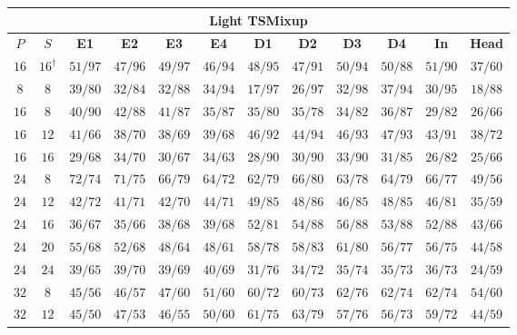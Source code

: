 \begin{table}[!tbp]
    \centering
    \small
    \setlength{\tabcolsep}{3.5pt}
    \begin{tabular}{@{}cccccccccccc@{}}
        \toprule
        \multicolumn{12}{c}{\textbf{Light TSMixup}} \\
        \midrule
        \textbf{$P$} & \textbf{$S$} & \textbf{E1} & \textbf{E2} & \textbf{E3} & \textbf{E4} & \textbf{D1} & \textbf{D2} & \textbf{D3} & \textbf{D4} & \textbf{In} & \textbf{Head} \\
        \midrule
        $16$ & $16^{\dagger}$ & $51/97$ & $47/96$ & $49/97$ & $46/94$ & $48/95$ & $47/91$ & $50/94$ & $50/88$ & $51/90$ & $37/60$ \\
        \midrule
        \addlinespace[2pt]
        $8$ & $8$ & $39/80$ & $32/84$ & $32/88$ & $34/94$ & $17/97$ & $26/97$ & $32/98$ & $37/94$ & $30/95$ & $18/88$ \\
        \addlinespace[2pt]
        $16$ & $8$ & $40/90$ & $42/88$ & $41/87$ & $35/87$ & $35/80$ & $35/78$ & $34/82$ & $36/87$ & $29/82$ & $26/66$ \\
        $16$ & $12$ & $41/66$ & $38/70$ & $38/69$ & $39/68$ & $46/92$ & $44/94$ & $46/93$ & $47/93$ & $43/91$ & $38/72$ \\
        $16$ & $16$ & $29/68$ & $34/70$ & $30/67$ & $34/63$ & $28/90$ & $30/90$ & $33/90$ & $31/85$ & $26/82$ & $25/66$ \\
        \addlinespace[2pt]
        $24$ & $8$ & $72/74$ & $71/75$ & $66/79$ & $64/72$ & $62/79$ & $66/80$ & $63/78$ & $64/79$ & $66/77$ & $49/56$ \\
        $24$ & $12$ & $42/72$ & $41/71$ & $42/70$ & $44/71$ & $49/85$ & $48/86$ & $46/85$ & $48/85$ & $46/81$ & $35/59$ \\
        $24$ & $16$ & $36/67$ & $35/66$ & $38/68$ & $39/68$ & $52/81$ & $54/88$ & $56/88$ & $53/88$ & $52/88$ & $43/66$ \\
        $24$ & $20$ & $55/68$ & $52/68$ & $48/64$ & $48/61$ & $58/78$ & $58/83$ & $61/80$ & $56/77$ & $56/75$ & $44/58$ \\
        $24$ & $24$ & $39/65$ & $39/70$ & $39/69$ & $40/69$ & $31/76$ & $34/72$ & $35/74$ & $35/73$ & $36/73$ & $24/59$ \\
        \addlinespace[2pt]
        $32$ & $8$ & $45/56$ & $46/57$ & $47/60$ & $51/60$ & $60/72$ & $60/73$ & $62/76$ & $62/74$ & $62/74$ & $54/60$ \\
        $32$ & $12$ & $45/50$ & $47/53$ & $46/55$ & $50/60$ & $61/75$ & $63/79$ & $57/76$ & $56/73$ & $59/72$ & $44/59$ \\

\end{tabular}
\end{table}
